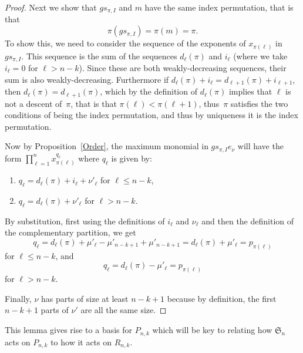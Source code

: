 \documentclass[ALCO,ThmDefs,Unicode,epreuves]{cedram}
\begin{document}
\begin{lemm}
\begin{proof}
	Next we show that $gs_{\pi,I}$ and $m$ have the same index permutation, that is that 
		\begin{equation}
\pi(gs_{\pi,I})=\pi(m)=\pi.
\end{equation}
 To show this, we need to consider the sequence of the exponents of $x_{\pi(\ell)}$ in $gs_{\pi,I}$. This sequence is the sum 
of the sequences $d_\ell(\pi)$ and $i_\ell$ (where we take $i_\ell=0$ for $\ell>n-k$). Since these are both 
weakly-decreasing sequences, their sum is also weakly-decreasing. Furthermore if 
$d_\ell(\pi)+i_\ell=d_{\ell+1}(\pi)+i_{\ell+1}$, then $d_\ell(\pi)=d_{\ell+1}(\pi)$, which by the definition of $d_\ell(\pi)$ 
implies that $\ell$ is not a descent of~$\pi$, that is that $\pi(\ell)<\pi(\ell+1)$, thus~$\pi$ satisfies the two 
conditions of being the index permutation, and thus by uniqueness it is the index permutation.



	Now by Proposition~\ref{Order}, the maximum monomial in $gs_{\pi,I}e_\nu$ will have the form $\prod_{\ell=1}^n 
x_{\pi(\ell)}^{q_{\ell}}$ where $q_\ell$ is given by:

	\begin{enumerate}

		\item $q_\ell=d_\ell(\pi)+i_\ell+\nu'_\ell$ for $\ell\leq n-k$,

		\item $q_\ell=d_\ell(\pi)+\nu'_\ell$ for $\ell> n-k$.

	\end{enumerate}

By substitution, first using the definitions of $i_\ell$ and $\nu_\ell$ and then the definition of the complementary partition, 
we get 
		\begin{equation}
q_\ell=d_\ell(\pi)+\mu'_\ell-\mu'_{n-k+1}+\mu'_{n-k+1}=d_\ell(\pi)+\mu'_\ell=p_{\pi(\ell)}
		\end{equation}
 for $\ell\leq n-k$, and 
		\begin{equation}
q_\ell=d_\ell(\pi)-\mu'_\ell=p_{\pi(\ell)}
\end{equation}
for $\ell>n-k$.


Finally, $\nu$ has parts of size at least $n-k+1$ because by definition, the first $n-k+1$ parts of $\nu'$ are all the same size.
	\end{proof}
\end{lemm}

This lemma gives rise to a basis for $P_{n,k}$ which will be key to relating how $\mathfrak{S}_n$ acts on $P_{n,k}$ to how it 
acts on $R_{n,k}$.
\end{document}
